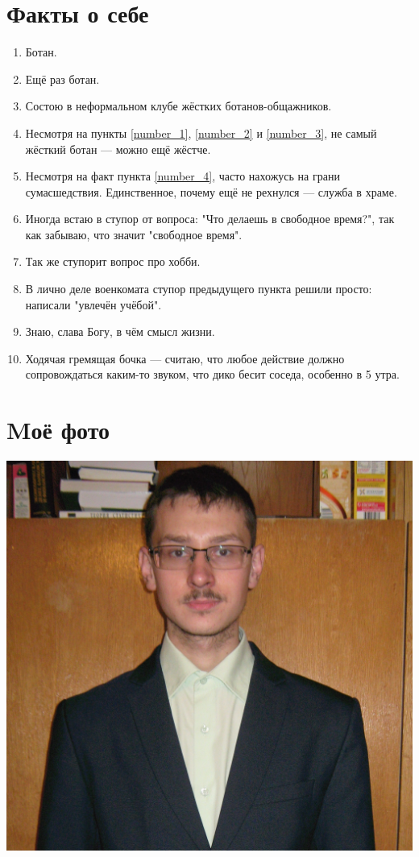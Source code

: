 \documentclass[12pt, a4paper]{article}
\begin{document}
\section{Факты о себе}

\begin{enumerate}
\item Ботан. \label{number_1}
\item Ещё раз ботан. \label{number_2}
\item Состою в неформальном клубе жёстких ботанов-общажников.\label{number_3}
\item Несмотря на пункты \ref{number_1}, \ref{number_2} и \ref{number_3}, не самый жёсткий ботан --- можно ещё жёстче. \label{number_4}
\item Несмотря на факт пункта \ref{number_4}, часто нахожусь на грани сумасшедствия. Единственное, почему ещё не рехнулся --- служба в храме.
\item Иногда встаю в ступор от вопроса: "Что делаешь в свободное время?", так как забываю, что значит "свободное время".
\item Так же ступорит вопрос про хобби.
\item В лично деле военкомата ступор предыдущего пункта решили просто: написали "увлечён учёбой".
\item Знаю, слава Богу, в чём смысл жизни. %
\item Ходячая гремящая бочка --- считаю, что любое действие должно сопровождаться каким-то звуком, что дико бесит соседа, особенно в 5 утра.
\end{enumerate}


\section{Mоё фото}

\includegraphics[scale=0.3]{I_03.jpg}
\end{document}
